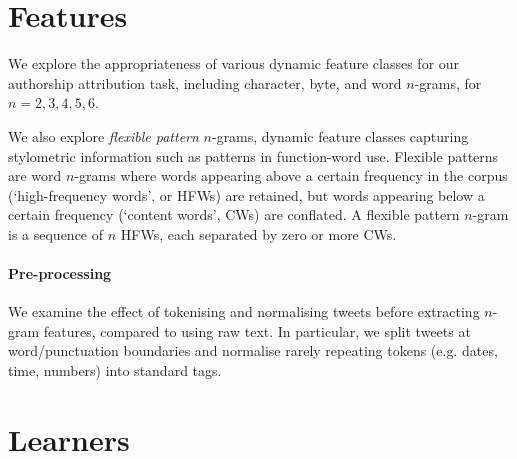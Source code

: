 \documentclass[twocolumn,10pt]{article}
\begin{document}
\section{Features}
We explore the appropriateness of various dynamic feature
classes for our authorship attribution task, including
character, byte, and word $n$-grams, for $n = 2,3,4,5,6$.

We also explore \emph{flexible pattern} $n$-grams, dynamic
feature classes capturing stylometric information such as
patterns in function-word use\supercite{schwartz2013authorship}.
Flexible patterns are word $n$-grams where words appearing
above a certain frequency in the corpus (`high-frequency words',
or HFWs) are retained, but words appearing below a certain
frequency (`content words', CWs) are conflated. A flexible
pattern $n$-gram is a sequence of $n$ HFWs, each separated
by zero or more CWs.


\paragraph{Pre-processing}
We examine the effect of tokenising and normalising tweets before
extracting $n$-gram features, compared to using raw text.
In particular, we split tweets at word/punctuation
boundaries and normalise rarely repeating tokens
(e.g. dates, time, numbers) into standard tags.


\section{Learners}
\end{document}
